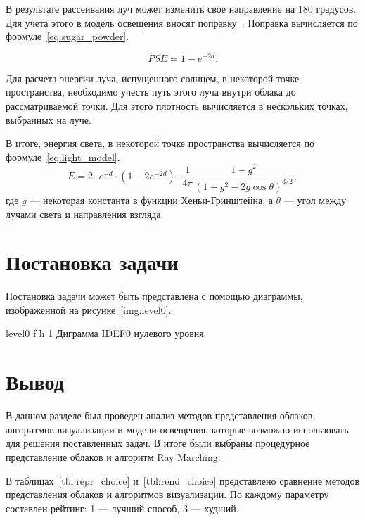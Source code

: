 В результате рассеивания луч может изменить свое направление на 180 градусов.
Для учета этого в модель освещения вносят поправку~\mbox{\cite{hzd, frostbite}}. Поправка вычисляется по формуле~\eqref{eq:sugar_powder}.

\begin{equation}
	\label{eq:sugar_powder}
	PSE = 1 - e ^ {-2 d}.
\end{equation}

Для расчета энергии луча, испущенного солнцем, в некоторой точке пространства, необходимо учесть путь этого луча внутри облака до рассматриваемой точки.
Для этого плотность вычисляется в нескольких точках, выбранных на луче.

В итоге, энергия света, в некоторой точке пространства вычисляется по формуле~\eqref{eq:light_model}.
\begin{equation}
	\label{eq:light_model}
	E = 2 \cdot e ^ {-d} \cdot (1 - 2 e ^ {-2d}) \cdot \frac{1}{4\pi} \frac{1 - g^2}{(1 + g^2 - 2g\cos \theta)^{3/2}},
\end{equation}
где $ g $ --- некоторая константа в функции Хеньи-Гринштейна, а $ \theta $ --- угол между лучами света и направления взгляда.

\section{Постановка задачи}

Постановка задачи может быть представлена с помощью диаграммы, изображенной на рисунке~\ref{img:level0}.

{level0} %
{f} %
{h} %
{1\textwidth} %
{Диграмма IDEF0 нулевого уровня} %



\section*{Вывод}

В данном разделе был проведен анализ методов представления облаков, алгоритмов визуализации и модели освещения, которые возможно использовать для решения поставленных задач. В итоге были выбраны процедурное представление облаков и алгоритм Ray Marching.

В таблицах~\ref{tbl:repr_choice} и~\ref{tbl:rend_choice} представлено сравнение методов представления облаков и алгоритмов визуализации. По каждому параметру составлен рейтинг: 1 --- лучший способ, 3 --- худший.


